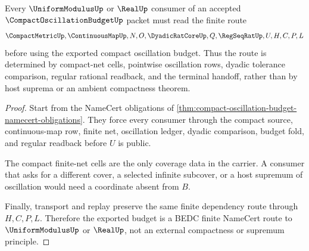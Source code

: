 \begin{theorem}
\label{thm:compact-oscillation-budget-finite-net-route}
Every $\UniformModulusUp$ or $\RealUp$ consumer of an accepted $\CompactOscillationBudgetUp$ packet must read the finite route
$$
\CompactMetricUp,\ContinuousMapUp,N,O,\DyadicRatCoreUp,Q,\RegSeqRatUp,U,H,C,P,L
$$
before using the exported compact oscillation budget. Thus the route is determined by compact-net cells, pointwise oscillation rows, dyadic tolerance comparison, regular rational readback, and the terminal handoff, rather than by host suprema or an ambient compactness theorem.
\end{theorem}
\begin{proof}
Start from the NameCert obligations of \autoref{thm:compact-oscillation-budget-namecert-obligations}. They force every consumer through the compact source, continuous-map row, finite net, oscillation ledger, dyadic comparison, budget fold, and regular readback before $U$ is public.

The compact finite-net cells are the only coverage data in the carrier. A consumer that asks for a different cover, a selected infinite subcover, or a host supremum of oscillation would need a coordinate absent from $B$.

Finally, transport and replay preserve the same finite dependency route through $H,C,P,L$. Therefore the exported budget is a BEDC finite NameCert route to $\UniformModulusUp$ or $\RealUp$, not an external compactness or supremum principle.
\end{proof}





